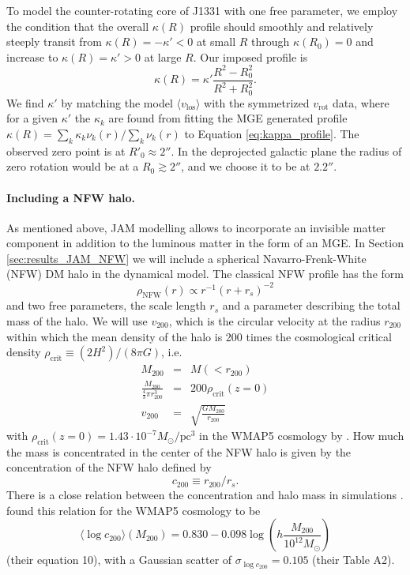 To model the counter-rotating core of J1331 with one free parameter, we employ the condition that the overall $\kappa(R)$ profile should smoothly and relatively steeply transit from $\kappa(R) = -\kappa' < 0$ at small $R$ through $\kappa(R_0) = 0$ and increase to $\kappa(R) = \kappa' > 0$ at large $R$. Our imposed profile is
\begin{equation}
\kappa(R) = \kappa' \frac{R^2 - R_0^2}{R^2 + R_0^2}. \label{eq:kappa_profile}
\end{equation}
We find $\kappa'$ by matching the model $\langle v_\text{los} \rangle$ with the symmetrized $v_\text{rot}$ data, where for a given $\kappa'$ the $\kappa_k$ are found from fitting the MGE generated profile $\kappa(R) = \sum_k \kappa_k \nu_k(r)/\sum_k \nu_k(r)$ to Equation \eqref{eq:kappa_profile}. The observed zero point is at $R'_0\approx 2''$. In the deprojected galactic plane the radius of zero rotation would be at a $R_0 \gtrsim 2''$, and we choose it to be at $2.2''$.

\paragraph{Including a NFW halo.} As mentioned above, JAM modelling allows to incorporate an invisible matter component in addition to the luminous matter in the form of an MGE. In Section \ref{sec:results_JAM_NFW} we will include a spherical Navarro-Frenk-White (NFW) DM halo \citep{NFW96} in the dynamical model. The classical NFW profile has the form
\begin{equation}
\rho_\text{NFW}(r) \propto r^{-1} \left( r+r_s \right)^{-2} \label{eq:NFWprofile}
\end{equation}
and two free parameters, the scale length $r_s$ and a parameter describing the total mass of the halo. We will use $v_\text{200}$, which is the circular velocity at the radius $r_\text{200}$ within which the mean density of the halo is 200 times the cosmological critical density $\rho_\text{crit} \equiv (2H^2)/(8\pi G)$, i.e.
\begin{eqnarray*}
M_\text{200} &=& M(<r_{200})\\
\frac{M_{200}}{ \frac 43 \pi r_{200}^3} &=& 200 \rho_\text{crit}(z=0) \\
v_\text{200} &=& \sqrt{\frac{GM_{200}}{r_\text{200}}}
\end{eqnarray*}
with $\rho_\text{crit}(z=0)=1.43 \cdot 10^{-7} M_\odot / \text{pc}^3$ in the WMAP5 cosmology by \citet{WMAP5cosm}. How much the mass is concentrated in the center of the NFW halo is given by the concentration of the NFW halo defined by 
\begin{equation}
c_{200}\equiv r_{200} / r_s. \label{eq:NFW_c}
\end{equation} 
There is a close relation between the concentration and halo mass in simulations \citep{NFW96}. \citet{Maccio08} found this relation for the WMAP5 cosmology to be
\begin{equation}
\langle \log c_{200} \rangle (M_{200}) = 0.830 - 0.098 \log \left(h \frac{M_{200}}{10^{12} M_\odot} \right) \label{eq:Maccio08}
\end{equation}
(their equation 10), with a Gaussian scatter of $\sigma_{\log c_{200}} = 0.105$ (their Table A2). 